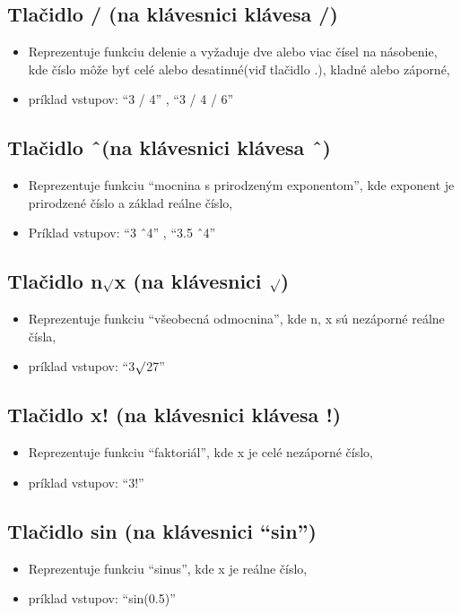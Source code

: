 \documentclass[a4paper, 11pt]{article}
\begin{document}
         \subsection{Tlačidlo / (na klávesnici klávesa /)}
        \begin{itemize}
            \item Reprezentuje funkciu delenie a vyžaduje dve alebo viac čísel na násobenie, kde číslo môže byť celé alebo desatinné(viď tlačidlo .), kladné alebo záporné,
            \item príklad vstupov:  “3 / 4” , “3 / 4 / 6”
        \end{itemize}
        
        \subsection{Tlačidlo \^\ (na klávesnici klávesa \^\ )}
        \begin{itemize}
            \item Reprezentuje funkciu “mocnina s prirodzeným exponentom”, kde exponent je prirodzené číslo a základ reálne číslo,
            \item Príklad vstupov:  “3 \^\ 4” , “3.5 \^\ 4”
        \end{itemize}
        
        \subsection{Tlačidlo n$\surd$x (na klávesnici $\surd$)}
        \begin{itemize}
            \item Reprezentuje funkciu “všeobecná odmocnina”, kde n, x sú nezáporné reálne čísla,
            \item príklad vstupov:  “3$\surd$27”
        \end{itemize}
        
        \subsection{Tlačidlo x! (na klávesnici klávesa !)}
        \begin{itemize}
            \item Reprezentuje funkciu “faktoriál”, kde x je celé nezáporné číslo,
            \item príklad vstupov:  “3!”
        \end{itemize}
        
        \subsection{Tlačidlo sin (na klávesnici “sin”)}
        \begin{itemize}
            \item Reprezentuje funkciu “sinus”, kde x je reálne číslo,
            \item príklad vstupov:  “sin(0.5)”
        \end{itemize}
        
\end{document}
